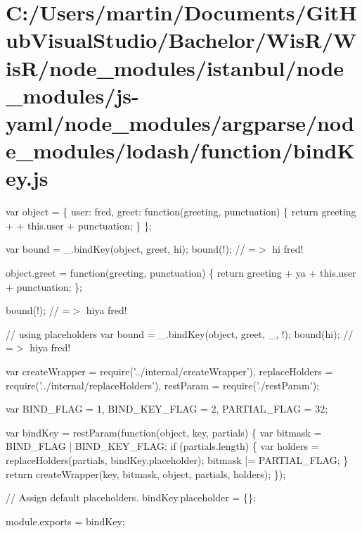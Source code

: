 \hypertarget{_c_1_2_users_2martin_2_documents_2_git_hub_visual_studio_2_bachelor_2_wis_r_2_wis_r_2node_module92d317f73318755fc6649978a9c24b01}{}\section{C\+:/\+Users/martin/\+Documents/\+Git\+Hub\+Visual\+Studio/\+Bachelor/\+Wis\+R/\+Wis\+R/node\+\_\+modules/istanbul/node\+\_\+modules/js-\/yaml/node\+\_\+modules/argparse/node\+\_\+modules/lodash/function/bind\+Key.\+js}
var object = \{ \textquotesingle{}user\textquotesingle{}\+: \textquotesingle{}fred\textquotesingle{}, \textquotesingle{}greet\textquotesingle{}\+: function(greeting, punctuation) \{ return greeting + \textquotesingle{} \textquotesingle{} + this.\+user + punctuation; \} \};

var bound = \+\_\+.\+bind\+Key(object, \textquotesingle{}greet\textquotesingle{}, \textquotesingle{}hi\textquotesingle{}); bound(\textquotesingle{}!\textquotesingle{}); // =$>$ \textquotesingle{}hi fred!\textquotesingle{}

object.\+greet = function(greeting, punctuation) \{ return greeting + \textquotesingle{}ya \textquotesingle{} + this.\+user + punctuation; \};

bound(\textquotesingle{}!\textquotesingle{}); // =$>$ \textquotesingle{}hiya fred!\textquotesingle{}

// using placeholders var bound = \+\_\+.\+bind\+Key(object, \textquotesingle{}greet\textquotesingle{}, \+\_\+, \textquotesingle{}!\textquotesingle{}); bound(\textquotesingle{}hi\textquotesingle{}); // =$>$ \textquotesingle{}hiya fred!\textquotesingle{}


\begin{DoxyCodeInclude}
var createWrapper = require(\textcolor{stringliteral}{'../internal/createWrapper'}),
    replaceHolders = require(\textcolor{stringliteral}{'../internal/replaceHolders'}),
    restParam = require(\textcolor{stringliteral}{'./restParam'});

var BIND\_FLAG = 1,
    BIND\_KEY\_FLAG = 2,
    PARTIAL\_FLAG = 32;

var bindKey = restParam(\textcolor{keyword}{function}(\textcolor{keywordtype}{object}, key, partials) \{
  var bitmask = BIND\_FLAG | BIND\_KEY\_FLAG;
  \textcolor{keywordflow}{if} (partials.length) \{
    var holders = replaceHolders(partials, bindKey.placeholder);
    bitmask |= PARTIAL\_FLAG;
  \}
  \textcolor{keywordflow}{return} createWrapper(key, bitmask, \textcolor{keywordtype}{object}, partials, holders);
\});

\textcolor{comment}{// Assign default placeholders.}
bindKey.placeholder = \{\};

module.exports = bindKey;
\end{DoxyCodeInclude}
 